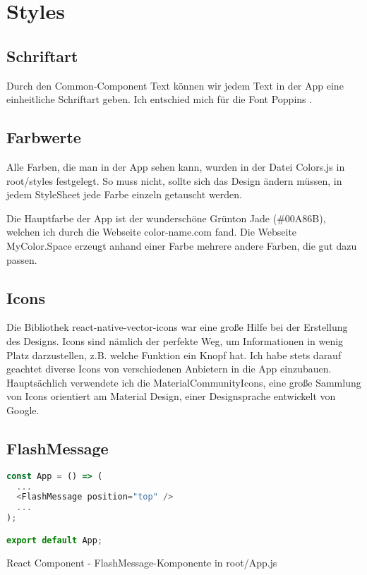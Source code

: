 \section{Styles}
\subsection{Schriftart}
Durch den Common-Component Text können wir jedem Text in der App eine einheitliche Schriftart geben.
Ich entschied mich für die Font Poppins \cite{poppins}.

\subsection{Farbwerte}
Alle Farben, die man in der App sehen kann, wurden in der Datei Colors.js in root/styles festgelegt.
So muss nicht, sollte sich das Design ändern müssen, in jedem StyleSheet jede Farbe einzeln
getauscht werden.

Die Hauptfarbe der App ist der wunderschöne Grünton Jade (\#00A86B), welchen ich durch die Webseite
color-name.com \cite{colorName} fand. Die Webseite MyColor.Space \cite{myColorSpace} erzeugt anhand
einer Farbe mehrere andere Farben, die gut dazu passen.

\subsection{Icons}
Die Bibliothek react-native-vector-icons \cite{reactNativeVectorIcons} war eine große Hilfe bei der
Erstellung des Designs. Icons sind nämlich der perfekte Weg, um Informationen in wenig Platz
darzustellen, z.B. welche Funktion ein Knopf hat. Ich habe stets darauf geachtet diverse Icons von
verschiedenen Anbietern in die App einzubauen. Hauptsächlich verwendete ich die
MaterialCommunityIcons, eine große Sammlung von Icons orientiert am Material Design, einer
Designsprache entwickelt von Google.

\newpage
\subsection{FlashMessage}
\begin{code}[htp]
\begin{lstlisting}[firstnumber=1,language=JavaScript, style=JSX]
const App = () => (
  ...
  <FlashMessage position="top" />
  ...
);

export default App;
\end{lstlisting}
\caption{React Component - FlashMessage-Komponente in root/App.js}
\end{code}

